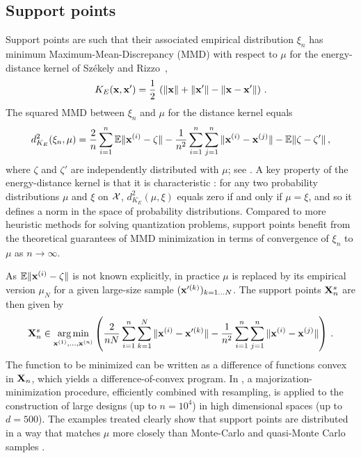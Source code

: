 \subsection{Support points}\label{S:SP}
Support points \cite{makjos18} are such that their associated empirical distribution $\xi_n$ has minimum Maximum-Mean-Discrepancy (MMD) with respect to $\mu$ for the energy-distance kernel of Sz\'ekely and Rizzo~\cite{szeriz04,szeriz13},  
\begin{equation}\label{eq:kE}
K_E({\bf x},{\bf x}') = \frac12\, \left(\Vert {\bf x} \Vert + \Vert {\bf x}' \Vert - \Vert {\bf x}-{\bf x}' \Vert\right)\,.
\end{equation} 
The squared MMD between $\xi_n$ and $\mu$ for the distance kernel equals
\begin{equation}\label{eq:energySP}
d_{K_E}^2(\xi_n,\mu) = \frac{2}{n} \sum_{i=1}^{n} \mathbb{E} \|{\bf x}^{(i)}-\zeta\| - \frac{1}{n^2} \sum_{i=1}^{n}\sum_{j=1}^{n}  \|{\bf x}^{(i)}-{\bf x}^{(j)}\| -  \mathbb{E} \|\zeta-\zeta'\| \,,
\end{equation}
where $\zeta$ and $\zeta'$ are independently distributed with $\mu$; see \cite{sejsri13}.
A key property of the energy-distance kernel is that it is characteristic \cite{srigre10}: for any two probability distributions $\mu$ and $\xi$ on $\mathcal{X}$, $d_{K_E}^2(\mu,\xi)$ equals zero if and only if $\mu=\xi$, and so it defines a norm in the space of probability distributions.
Compared to more heuristic methods for solving quantization problems, support points
benefit from the theoretical guarantees of MMD minimization in terms of convergence of $\xi_n$ to $\mu$ as $n\to\infty$. 

As $\mathbb{E} \|{\bf x}^{(i)}-\zeta\|$ is not known explicitly, in practice $\mu$ is replaced by its empirical version $\mu_N$ for a given large-size sample $({\bf x}'^{(k)})_{k=1\ldots N}$. 
The support points ${\bf X}_n^s$ are then given by
\begin{equation}\label{eq:SPestim}
{\bf X}_n^s \in \operatorname*{arg\,min}_{{\bf x}^{(1)},\ldots,{\bf x}^{(n)}} \left( \frac{2}{n N} \sum_{i=1}^{n} \sum_{k=1}^N \|{\bf x}^{(i)}-{\bf x}'^{(k)}\| - \frac{1}{{n}^2} \sum_{i=1}^{n}\sum_{j=1}^{n} \|{\bf x}^{(i)}-{\bf x}^{(j)}\| \right) \,.
\end{equation}
The function to be minimized can be written as a difference of functions convex in ${\bf X}_n$, which yields a difference-of-convex program. 
In \cite{makjos18}, a majorization-minimization procedure, efficiently combined with resampling, is applied to the construction of large designs (up to $n=10^4$) in high dimensional spaces (up to $d=500$). The examples treated clearly show that support points are distributed in a way that matches $\mu$ more closely than Monte-Carlo and quasi-Monte Carlo samples \cite{fanli06}.

